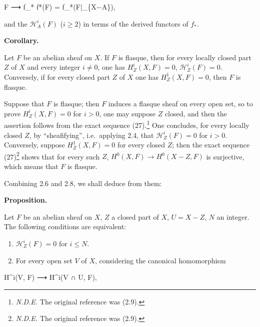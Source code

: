 \documentclass[
  11pt,
  a4paper,
]{book}
\newenvironment{Shaded}{}{}
\newcommand{\NormalTok}[1]{#1}
\begin{document}
\begin{Shaded}
\begin{Highlighting}[]
\NormalTok{F ⟶ f\_* f*(F) = f\_*(F|\_\{X−A\}),}
\end{Highlighting}
\end{Shaded}

and the \(\mathcal{H}^{i}_{A}(F)\) (\(i \geqslant 2\)) in terms of the
derived functors of \(f_{*}\).

\textbf{Corollary.}

Let \(F\) be an abelian sheaf on \(X\). If \(F\) is flasque, then for
every locally closed part \(Z\) of \(X\) and every integer \(i \neq 0\),
one has \(H^{i}_{Z}(X, F) = 0\), \(\mathcal{H}^{i}_{Z}(F) = 0\).
Conversely, if for every closed part \(Z\) of \(X\) one has
\(H^{1}_{Z}(X, F) = 0\), then \(F\) is flasque.

Suppose that \(F\) is flasque; then \(F\) induces a flasque sheaf on
every open set, so to prove \(H^{i}_{Z}(X, F) = 0\) for \(i > 0\), one
may suppose \(Z\) closed, and then the assertion follows from the exact
sequence (27).\footnote{\emph{N.D.E.} The original reference was (2.9).}
One concludes, for every locally closed \(Z\), by ``sheafifying'',
i.e.~applying 2.4, that \(\mathcal{H}^{i}_{Z}(F) = 0\) for \(i >
0\). Conversely, suppose \(H^{1}_{Z}(X, F) = 0\) for every closed \(Z\);
then the exact sequence (27)\footnote{\emph{N.D.E.} The original
  reference was (2.9).} shows that for every such \(Z\),
\(H^{0}(X, F) \to H^{0}(X - Z, F)\) is surjective, which means that
\(F\) is flasque.

Combining 2.6 and 2.8, we shall deduce from them:

\textbf{Proposition.}

Let \(F\) be an abelian sheaf on \(X\), \(Z\) a closed part of \(X\),
\(U = X - Z\), \(N\) an integer. The following conditions are
equivalent:

\begin{enumerate}
\def\labelenumi{(\roman{enumi})}
\item
  \(\mathcal{H}^{i}_{Z}(F) = 0\) for \(i \leqslant N\).
\item
  For every open set \(V\) of \(X\), considering the canonical
  homomorphism
\end{enumerate}

\begin{Shaded}
\begin{Highlighting}[]
\NormalTok{H\^{}i(V, F) ⟶ H\^{}i(V ∩ U, F),}
\end{Highlighting}
\end{Shaded}
\end{document}
